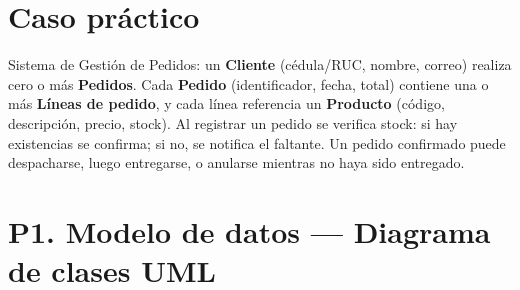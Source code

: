 \documentclass[11pt,letterpaper]{article}
\begin{document}
\section*{Caso práctico}
Sistema de Gestión de Pedidos: un \textbf{Cliente} (cédula/RUC, nombre, correo) realiza cero o más \textbf{Pedidos}. Cada \textbf{Pedido} (identificador, fecha, total) contiene una o más \textbf{Líneas de pedido}, y cada línea referencia un \textbf{Producto} (código, descripción, precio, stock). Al registrar un pedido se verifica stock: si hay existencias se confirma; si no, se notifica el faltante. Un pedido confirmado puede despacharse, luego entregarse, o anularse mientras no haya sido entregado.

\section{P1. Modelo de datos --- Diagrama de clases UML}
\end{document}
